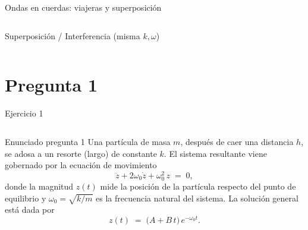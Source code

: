 \documentclass[
    10pt,
    aspectratio=169,
    xcolor={dvipsnames},
    spanish,
    ]{beamer}
\begin{document}
\begin{frame}{Ondas en cuerdas: viajeras y superposición}
\begin{columns}[T,totalwidth=\textwidth]
\begin{column}{0.5\textwidth}
\begin{block}{Superposición / Interferencia (misma $k,\omega$)}
      \end{block}
    \end{column}
  \end{columns}
\end{frame}




\section{Pregunta 1}

\begin{frame}{Ejercicio 1}
  \begin{columns}[T,totalwidth=\textwidth]
    \begin{column}{0.6\textwidth}
      \begin{block}{Enunciado pregunta 1}
        \footnotesize
        Una partícula de masa $m$, después de caer una distancia $h$, se adosa a un resorte (largo) de constante $k$.
El sistema resultante viene gobernado por la ecuación de movimiento
\begin{equation}
  \ddot z + 2\omega_0 \dot z + \omega_0^{2}\, z \;=\; 0,
  \label{eq:crit}
\end{equation}
donde la magnitud $z(t)$ mide la posición de la partícula respecto del punto de equilibrio y
$\omega_0=\sqrt{k/m}$ es la frecuencia natural del sistema. La solución general está dada por
\begin{equation}
  z(t) \;=\; \big(A + B\,t\big)\,e^{-\omega_0 t}.
\end{equation}


\end{block}
\end{column}
\end{columns}
\end{frame}
\end{document}
